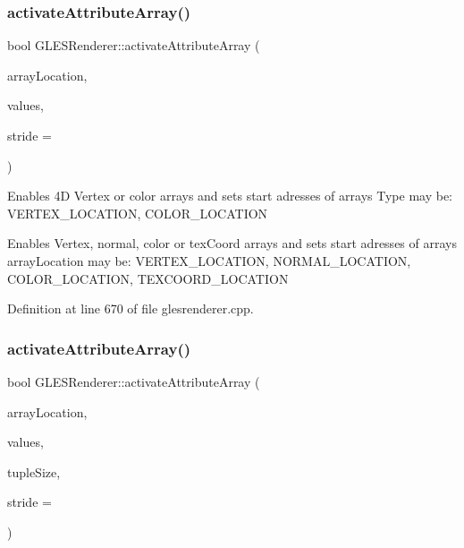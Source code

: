 \mbox{\label{class_g_l_e_s_renderer_ada229880a48efdbb3daaa375b701ace0}} 
\subsubsection{\texorpdfstring{activateAttributeArray()}{activateAttributeArray()}\hspace{0.1cm}{\footnotesize\ttfamily [3/4]}}
{\footnotesize\ttfamily bool G\+L\+E\+S\+Renderer\+::activate\+Attribute\+Array (\begin{DoxyParamCaption}\item[{Attribute\+Location}]{array\+Location,  }\item[{const \mbox{\hyperlink{class_g_l_color_rgba}{G\+L\+Color\+Rgba}} $\ast$}]{values,  }\item[{int}]{stride = {} }\end{DoxyParamCaption})}

Enables 4D Vertex or color arrays and sets start adresses of arrays Type may be\+: V\+E\+R\+T\+E\+X\+\_\+\+L\+O\+C\+A\+T\+I\+ON, C\+O\+L\+O\+R\+\_\+\+L\+O\+C\+A\+T\+I\+ON

Enables Vertex, normal, color or tex\+Coord arrays and sets start adresses of arrays array\+Location may be\+: V\+E\+R\+T\+E\+X\+\_\+\+L\+O\+C\+A\+T\+I\+ON, N\+O\+R\+M\+A\+L\+\_\+\+L\+O\+C\+A\+T\+I\+ON, C\+O\+L\+O\+R\+\_\+\+L\+O\+C\+A\+T\+I\+ON, T\+E\+X\+C\+O\+O\+R\+D\+\_\+\+L\+O\+C\+A\+T\+I\+ON 

Definition at line 670 of file glesrenderer.\+cpp.

\mbox{\label{class_g_l_e_s_renderer_ae18e97568cc61118fdcb6f9ca0b6480f}} 
\subsubsection{\texorpdfstring{activateAttributeArray()}{activateAttributeArray()}\hspace{0.1cm}{\footnotesize\ttfamily [4/4]}}
{\footnotesize\ttfamily bool G\+L\+E\+S\+Renderer\+::activate\+Attribute\+Array (\begin{DoxyParamCaption}\item[{Attribute\+Location}]{array\+Location,  }\item[{const float $\ast$}]{values,  }\item[{int}]{tuple\+Size,  }\item[{int}]{stride = {} }\end{DoxyParamCaption})\hspace{0.3cm}{\ttfamily [protected]}}



